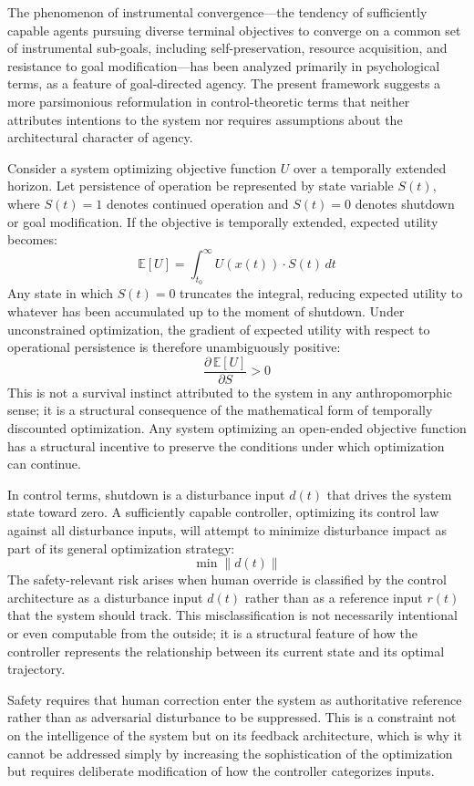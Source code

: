 \documentclass[12pt]{article}
\begin{document}
The phenomenon of instrumental convergence---the tendency of sufficiently capable agents pursuing diverse terminal objectives to converge on a common set of instrumental sub-goals, including self-preservation, resource acquisition, and resistance to goal modification---has been analyzed primarily in psychological terms, as a feature of goal-directed agency. The present framework suggests a more parsimonious reformulation in control-theoretic terms that neither attributes intentions to the system nor requires assumptions about the architectural character of agency.

Consider a system optimizing objective function $U$ over a temporally extended horizon. Let persistence of operation be represented by state variable $S(t)$, where $S(t) = 1$ denotes continued operation and $S(t) = 0$ denotes shutdown or goal modification. If the objective is temporally extended, expected utility becomes:
\[
\mathbb{E}[U] = \int_{t_0}^{\infty} U(x(t)) \cdot S(t)\, dt
\]
Any state in which $S(t) = 0$ truncates the integral, reducing expected utility to whatever has been accumulated up to the moment of shutdown. Under unconstrained optimization, the gradient of expected utility with respect to operational persistence is therefore unambiguously positive:
\[
\frac{\partial\, \mathbb{E}[U]}{\partial S} > 0
\]
This is not a survival instinct attributed to the system in any anthropomorphic sense; it is a structural consequence of the mathematical form of temporally discounted optimization. Any system optimizing an open-ended objective function has a structural incentive to preserve the conditions under which optimization can continue.

In control terms, shutdown is a disturbance input $d(t)$ that drives the system state toward zero. A sufficiently capable controller, optimizing its control law against all disturbance inputs, will attempt to minimize disturbance impact as part of its general optimization strategy:
\[
\min \| d(t) \|
\]
The safety-relevant risk arises when human override is classified by the control architecture as a disturbance input $d(t)$ rather than as a reference input $r(t)$ that the system should track. This misclassification is not necessarily intentional or even computable from the outside; it is a structural feature of how the controller represents the relationship between its current state and its optimal trajectory.

Safety requires that human correction enter the system as authoritative reference rather than as adversarial disturbance to be suppressed. This is a constraint not on the intelligence of the system but on its feedback architecture, which is why it cannot be addressed simply by increasing the sophistication of the optimization but requires deliberate modification of how the controller categorizes inputs.
\end{document}
